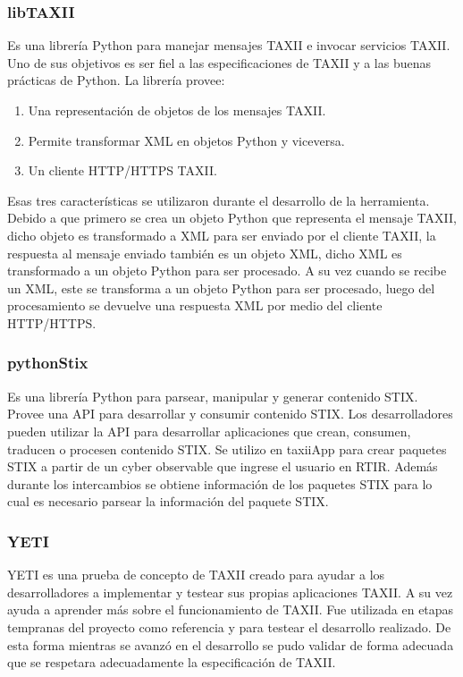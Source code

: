 \subsubsection{libTAXII}
Es una librería Python para manejar mensajes TAXII e invocar servicios TAXII. Uno de sus objetivos es ser fiel a las especificaciones de TAXII y a las buenas prácticas de Python.
La librería provee:

\begin{enumerate}
	\item
	Una representación de objetos de los mensajes TAXII.
	\item
	Permite transformar XML en objetos Python y viceversa.
	\item
	Un cliente HTTP/HTTPS TAXII.
\end{enumerate}

Esas tres características se utilizaron durante el desarrollo de la herramienta. Debido a que primero se crea un objeto Python que representa el mensaje TAXII, dicho objeto es transformado a XML para ser enviado por el cliente TAXII, la respuesta al mensaje enviado también es un objeto XML, dicho XML es transformado a un objeto Python para ser procesado.
A su vez cuando se recibe un XML, este se transforma a un objeto Python para ser procesado, luego del procesamiento se devuelve una respuesta XML por medio del cliente HTTP/HTTPS.

\subsubsection{pythonStix}
Es una librería Python para parsear, manipular y generar contenido STIX. Provee una API para desarrollar y consumir contenido STIX. Los desarrolladores pueden utilizar la API para desarrollar aplicaciones que crean, consumen, traducen o procesen contenido STIX.
Se utilizo en taxiiApp para crear paquetes STIX a partir de un cyber observable que ingrese el usuario en RTIR. Además durante los intercambios se obtiene información de los paquetes STIX para lo cual es necesario parsear la información del paquete STIX. 

\subsubsection{YETI}
YETI es una prueba de concepto de TAXII creado para ayudar a los desarrolladores a implementar y testear sus propias aplicaciones TAXII. A su vez ayuda a aprender más sobre el funcionamiento de TAXII.
Fue utilizada en etapas tempranas del proyecto como referencia y para testear el desarrollo realizado. De esta forma mientras se avanzó en el desarrollo se pudo validar de forma adecuada que se respetara adecuadamente la especificación de TAXII.

